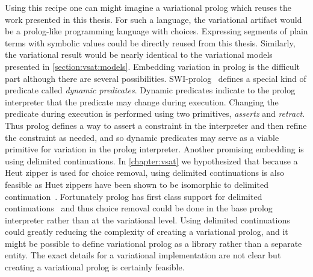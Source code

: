 Using this recipe one can might imagine a variational prolog which reuses the
work presented in this thesis. For such a language, the variational artifact
would be a prolog-like programming language with choices. Expressing segments of
plain terms with symbolic values could be directly reused from this thesis.
Similarly, the variational result would be nearly identical to the variational
models presented in \autoref{section:vsat:models}. Embedding variation in prolog
is the difficult part although there are several possibilities.
SWI-prolog~\cite{wielemaker:2011:tplp} defines a special kind of predicate
called \emph{dynamic predicates}. Dynamic predicates indicate to the prolog
interpreter that the predicate may change during execution. Changing the
predicate during execution is performed using two primitives, \emph{assertz} and
\emph{retract}. Thus prolog defines a way to assert a constraint in the
interpreter and then refine the constraint as needed, and so dynamic predicates
may serve as a viable primitive for variation in the prolog interpreter. Another
promising embedding is using delimited continuations. In \autoref{chapter:vsat}
we hypothesized that because a Heut zipper is used for choice removal, using
delimited continuations is also feasible as Huet zippers have been shown to be
isomorphic to delimited continuation~\cite{olegZippers}. Fortunately prolog has
first class support for delimited
continuations~\cite{DBLP:journals/tplp/SchrijversDDW13} and thus choice removal
could be done in the base prolog interpreter rather than at the variational
level. Using delimited continuations could greatly reducing the complexity of
creating a variational prolog, and it might be possible to define variational
prolog as a library rather than a separate entity. The exact details for a
variational implementation are not clear but creating a variational prolog is
certainly feasible.

